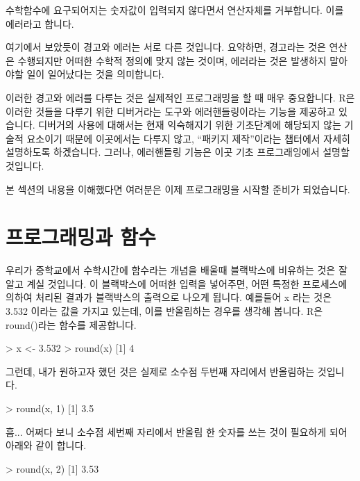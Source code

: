 수학함수에 요구되어지는 숫자값이 입력되지 않다면서 연산자체를 거부합니다. 
이를 에러라고 합니다. 

여기에서 보았듯이 경고와 에러는 서로 다른 것입니다.
요약하면, 경고라는 것은 연산은 수행되지만 어떠한 수학적 정의에 맞지 않는 것이며, 에러라는 것은 발생하지 말아야할 일이 일어났다는 것을 의미합니다. 

이러한 경고와 에러를 다루는 것은 실제적인 프로그래밍을 할 때 매우 중요합니다. 
R은 이러한 것들을 다루기 위한 디버거라는 도구와 에러핸들링이라는 기능을 제공하고 있습니다.
디버거의 사용에 대해서는 현재 익숙해지기 위한 기초단계에 해당되지 않는 기술적 요소이기 때문에 이곳에서는 다루지 않고, 
``패키지 제작''이라는 챕터에서 자세히 설명하도록 하겠습니다. 
그러나, 에러핸들링 기능은 이곳 기초 프로그래잉에서 설명할 것입니다. 

본 섹션의 내용을 이해했다면 여러분은 이제 프로그래밍을 시작할 준비가 되었습니다. 

\section{프로그래밍과 함수}

우리가 중학교에서 수학시간에 함수라는 개념을 배울때 블랙박스에 비유하는 것은 잘 알고 계실 것입니다. 
이 블랙박스에 어떠한 입력을 넣어주면, 어떤 특정한 프로세스에 의하여 처리된 결과가 블랙박스의 출력으로 나오게 됩니다. 
예를들어 x 라는 것은 3.532 이라는 값을 가지고 있는데, 이를 반올림하는 경우를 생각해 봅니다.
R은 round()라는 함수를 제공합니다. 

\begin{Schunk}
\begin{Soutput}
> x <- 3.532
> round(x)
[1] 4
\end{Soutput}
\end{Schunk}

그런데, 내가 원하고자 했던 것은 실제로 소수점 두번째 자리에서 반올림하는 것입니다. 

\begin{Schunk}
\begin{Soutput}
> round(x, 1)
[1] 3.5
\end{Soutput}
\end{Schunk}

흠... 어쩌다 보니 소수점 세번째 자리에서 반올림 한 숫자를 쓰는 것이 필요하게 되어 아래와 같이 합니다.

\begin{Schunk}
\begin{Soutput}
> round(x, 2)
[1] 3.53
\end{Soutput}
\end{Schunk}

